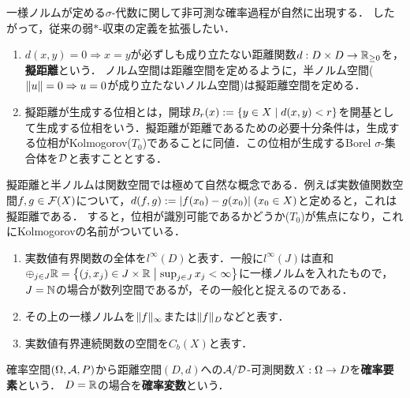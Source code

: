 \documentclass[uplatex,dvipdfmx]{jsreport}
\begin{document}
\begin{tcolorbox}[colframe=ForestGreen, colback=ForestGreen!10!white,breakable,colbacktitle=ForestGreen!40!white,coltitle=black,fonttitle=\bfseries\sffamily,
title=]
    一様ノルムが定める$\sigma$-代数に関して非可測な確率過程が自然に出現する．
    したがって，従来の弱$*$-収束の定義を拡張したい．
\end{tcolorbox}

\begin{definition}[pseudometric]\mbox{}
    \begin{enumerate}
        \item $d(x,y)=0\Rightarrow x=y$が必ずしも成り立たない距離関数$d:D\times D\to\mathbb{R}_{\ge 0}$を，\textbf{擬距離}という．
        ノルム空間は距離空間を定めるように，半ノルム空間($\|u\|=0\Rightarrow u=0$が成り立たないノルム空間)は擬距離空間を定める．
        \item 擬距離が生成する位相とは，開球$B_r(x):=\left\{y\in X\mid d(x,y)< r\right\}$を開基として生成する位相をいう．擬距離が距離であるための必要十分条件は，生成する位相がKolmogorov($T_0$)であることに同値．この位相が生成するBorel $\sigma$-集合体を$\mathcal{D}$と表すこととする．
    \end{enumerate}
\end{definition}
\begin{remark}
    擬距離と半ノルムは関数空間では極めて自然な概念である．例えば実数値関数空間$f,g\in\mathcal{F}(X)$について，$d(f,g):=\lvert f(x_0)-g(x_0)\rvert\;(x_0\in X)$と定めると，これは擬距離である．
    すると，位相が識別可能であるかどうか($T_0$)が焦点になり，これにKolmogorovの名前がついている．
\end{remark}

\begin{notation}[関数空間の記法]\mbox{}
    \begin{enumerate}
        \item 実数値有界関数の全体を$l^\infty(D)$と表す．一般に$l^\infty(J)$は直和$\oplus_{j\in J}\mathbb{R}=\left\{(j,x_j)\in J\times\mathbb{R}\;\middle|\; \sup_{j\in J}x_j<\infty\right\}$に一様ノルムを入れたもので，$J=\mathbb{N}$の場合が数列空間であるが，その一般化と捉えるのである．
        \item その上の一様ノルムを$\|f\|_\infty$または$\|f\|_D$などと表す．
        \item 実数値有界連続関数の空間を$C_b(X)$と表す．
    \end{enumerate}
\end{notation}

\begin{definition}
    確率空間$(\Omega,\mathcal{A},P)$から距離空間$(D,d)$への$\mathcal{A}/\mathcal{D}$-可測関数$X:\Omega\to D$を\textbf{確率要素}という．
    $D=\mathbb{R}$の場合を\textbf{確率変数}という．
\end{definition}
\end{document}
